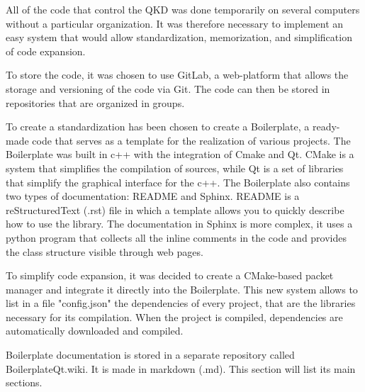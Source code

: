 All of the code that control the QKD was done temporarily on several computers without a particular organization. It was therefore necessary to implement an easy system that would allow standardization, memorization, and simplification of code expansion.

To store the code, it was chosen to use GitLab, a web-platform that allows the storage and versioning of the code via Git. The code can then be stored in repositories that are organized in groups.

To create a standardization has been chosen to create a Boilerplate, a ready-made code that serves as a template for the realization of various projects. The Boilerplate was built in c++ with the integration of Cmake and Qt.
CMake is a system that simplifies the compilation of sources, while Qt is a set of libraries that simplify the graphical interface for the c++. The Boilerplate also contains two types of documentation: README and Sphinx.
README is a reStructuredText (.rst) file in which a template allows you to quickly describe how to use the library.
The documentation in Sphinx is more complex, it uses a python program that collects all the inline comments in the code and provides the class structure visible through web pages.

To simplify code expansion, it was decided to create a CMake-based packet manager and integrate it directly into the Boilerplate. This new system allows to list in a file "config.json" the dependencies of every project, that are the libraries necessary for its compilation.
When the project is compiled, dependencies are automatically downloaded and compiled.

Boilerplate documentation is stored in a separate repository called BoilerplateQt.wiki. It is made in markdown (.md). This section will list its main sections.






